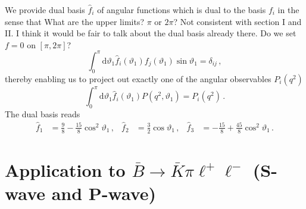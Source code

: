 \documentclass[aps,prd,reprint,nofootinbib,preprintnumbers]{revtex4}
\newcommand{\dd}{\text{d}}
\renewcommand{\theta}{\vartheta}
\newcommand{\fred}[1]{{\color{brown!85!black}#1}}
\begin{document}
We provide dual basis $\hat{f}_i$ of angular functions which is dual to the basis $f_i$ in the sense that \fred{What are the upper limits? $\pi$ or $2 \pi$? Not consistent with section I and II. I think it would be fair to talk about the dual basis already there. Do we set $f=0$ on $[\pi, 2 \pi]$?}
\begin{equation}
    \int_0^\pi \dd\theta_1 \hat{f}_i(\theta_1) f_j(\theta_1) \sin\theta_1 = \delta_{ij}\,,
\end{equation}
thereby enabling us to project out exactly one of the angular
observables $P_i(q^2)$
\begin{equation}
    \int_0^\pi \dd \theta_1\hat{f}_i(\theta_1) P(q^2, \theta_1) = P_i(q^2)\,.
\end{equation}
The dual basis reads
\begin{equation}
\begin{aligned}
    \hat{f}_1 & = \frac{9}{8} - \frac{15}{8}\cos^2\theta_1\,, &
    \hat{f}_2 & = \frac{3}{2}\cos\theta_1\,, &
    \hat{f}_3 & = -\frac{15}{8} + \frac{45}{8}\cos^2\theta_1\,.
\end{aligned}
\end{equation}

\section{Application to $\bar{B}\to\bar{K}\pi\ell^+\ell^-$ (S-wave and P-wave)}
\label{app:btokstarll}
\end{document}
